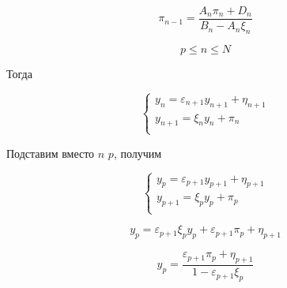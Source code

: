 \begin{equation*}
    \pi_{n-1} = \frac{A_n\pi_n + D_n}{B_n - A_n\xi_n}
\end{equation*}

\begin{equation*}
    p \le n \le N
\end{equation*}

Тогда

\begin{equation*}
    \begin{cases}
        y_n = \varepsilon_{n+1}y_{n+1}+\eta_{n+1} \\
        y_{n+1} = \xi_{n}y_{n} + \pi_{n} \\
    \end{cases}
\end{equation*}

Подставим вместо $n$ $p$, получим

\begin{equation*}
    \begin{cases}
        y_p = \varepsilon_{p+1}y_{p+1}+\eta_{p+1} \\
        y_{p+1} = \xi_{p}y_{p} + \pi_{p} \\
    \end{cases}
\end{equation*}

\begin{equation*}
    y_p = \varepsilon_{p+1}\xi_py_p + \varepsilon_{p+1}\pi_p + \eta_{p+1}
\end{equation*}

\begin{equation*}
    y_p = \frac{\varepsilon_{p+1}\pi_p + \eta_{p+1}}{1 - \varepsilon_{p+1}\xi_{p}}
\end{equation*}

